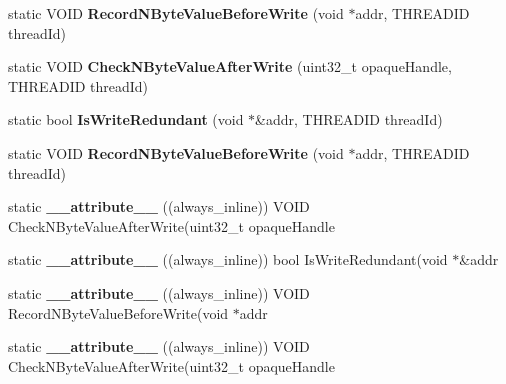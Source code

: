 \begin{DoxyCompactItemize}
\item 
\hypertarget{structRedSpyAnalysis_a267b5e1224f000fe96f66a25317811dd}{static V\-O\-I\-D {\bfseries Record\-N\-Byte\-Value\-Before\-Write} (void $\ast$addr, T\-H\-R\-E\-A\-D\-I\-D thread\-Id)}\label{structRedSpyAnalysis_a267b5e1224f000fe96f66a25317811dd}

\item 
\hypertarget{structRedSpyAnalysis_a25213888f435527a83af11e93c7d0bf5}{static V\-O\-I\-D {\bfseries Check\-N\-Byte\-Value\-After\-Write} (uint32\-\_\-t opaque\-Handle, T\-H\-R\-E\-A\-D\-I\-D thread\-Id)}\label{structRedSpyAnalysis_a25213888f435527a83af11e93c7d0bf5}

\item 
\hypertarget{structRedSpyAnalysis_a0a5d87c8a4ffd7e99a66272071b48b2a}{static bool {\bfseries Is\-Write\-Redundant} (void $\ast$\&addr, T\-H\-R\-E\-A\-D\-I\-D thread\-Id)}\label{structRedSpyAnalysis_a0a5d87c8a4ffd7e99a66272071b48b2a}

\item 
\hypertarget{structRedSpyAnalysis_a267b5e1224f000fe96f66a25317811dd}{static V\-O\-I\-D {\bfseries Record\-N\-Byte\-Value\-Before\-Write} (void $\ast$addr, T\-H\-R\-E\-A\-D\-I\-D thread\-Id)}\label{structRedSpyAnalysis_a267b5e1224f000fe96f66a25317811dd}

\item 
\hypertarget{structRedSpyAnalysis_ab62f13b23858cc46ae34b668b71afe80}{static {\bfseries \-\_\-\-\_\-attribute\-\_\-\-\_\-} ((always\-\_\-inline)) V\-O\-I\-D Check\-N\-Byte\-Value\-After\-Write(uint32\-\_\-t opaque\-Handle}\label{structRedSpyAnalysis_ab62f13b23858cc46ae34b668b71afe80}

\item 
\hypertarget{structRedSpyAnalysis_a7535fac0a0e053e60b39fa2f23b3701f}{static {\bfseries \-\_\-\-\_\-attribute\-\_\-\-\_\-} ((always\-\_\-inline)) bool Is\-Write\-Redundant(void $\ast$\&addr}\label{structRedSpyAnalysis_a7535fac0a0e053e60b39fa2f23b3701f}

\item 
\hypertarget{structRedSpyAnalysis_ad09b31fd6c23d44ab50798a11711fb1a}{static {\bfseries \-\_\-\-\_\-attribute\-\_\-\-\_\-} ((always\-\_\-inline)) V\-O\-I\-D Record\-N\-Byte\-Value\-Before\-Write(void $\ast$addr}\label{structRedSpyAnalysis_ad09b31fd6c23d44ab50798a11711fb1a}

\item 
\hypertarget{structRedSpyAnalysis_ab62f13b23858cc46ae34b668b71afe80}{static {\bfseries \-\_\-\-\_\-attribute\-\_\-\-\_\-} ((always\-\_\-inline)) V\-O\-I\-D Check\-N\-Byte\-Value\-After\-Write(uint32\-\_\-t opaque\-Handle}\label{structRedSpyAnalysis_ab62f13b23858cc46ae34b668b71afe80}

\end{DoxyCompactItemize}
